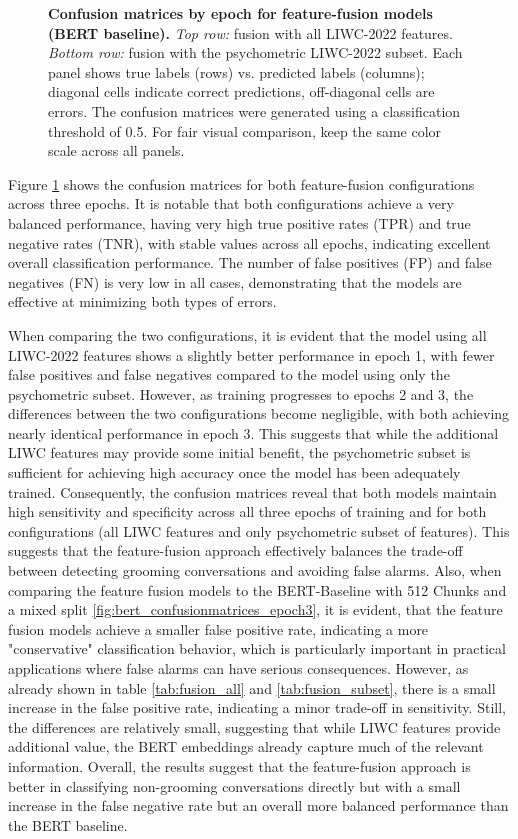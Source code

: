 \begin{figure}[H]
  \caption[Confusion matrices by epoch for feature-fusion models.]{\textbf{Confusion matrices by epoch for feature-fusion models (BERT baseline).}
  \emph{Top row:} fusion with all LIWC-2022 features. \emph{Bottom row:} fusion with the psychometric LIWC-2022 subset.
  Each panel shows true labels (rows) vs. predicted labels (columns); diagonal cells indicate correct predictions, off-diagonal cells are errors. The confusion matrices were generated using a classification threshold of 0.5.
  For fair visual comparison, keep the same color scale across all panels.}
  \label{fig:ff_confmats_epochs}
\end{figure}

Figure \ref{fig:ff_confmats_epochs} shows the confusion matrices for both feature-fusion configurations across three epochs. It is notable that both configurations achieve a very balanced performance, having very high true positive rates (TPR) and true negative rates (TNR), with stable values across all epochs, indicating excellent overall classification performance. The number of false positives (FP) and false negatives (FN) is very low in all cases, demonstrating that the models are effective at minimizing both types of errors. 

When comparing the two configurations, it is evident that the model using all LIWC-2022 features shows a slightly better performance in epoch 1, with fewer false positives and false negatives compared to the model using only the psychometric subset. However, as training progresses to epochs 2 and 3, the differences between the two configurations become negligible, with both achieving nearly identical performance in epoch 3. This suggests that while the additional LIWC features may provide some initial benefit, the psychometric subset is sufficient for achieving high accuracy once the model has been adequately trained. Consequently, the confusion matrices reveal that both models maintain high sensitivity and specificity across all three epochs of training and for both configurations (all LIWC features and only psychometric subset of features). This suggests that the feature-fusion approach effectively balances the trade-off between detecting grooming conversations and avoiding false alarms. Also, when comparing the feature fusion models to  the BERT-Baseline with 512 Chunks and a mixed split \ref{fig:bert_confusionmatrices_epoch3}, it is evident, that the feature fusion models achieve a smaller false positive rate, indicating a more "conservative" classification behavior, which is particularly important in practical applications where false alarms can have serious consequences. However, as already shown in table \ref{tab:fusion_all} and \ref{tab:fusion_subset}, there is a small increase in the false positive rate, indicating a minor trade-off in sensitivity. Still, the differences are relatively small, suggesting that while LIWC features provide additional value, the BERT embeddings already capture much of the relevant information. Overall, the results suggest that the feature-fusion approach is better in classifying non-grooming conversations directly but with a small increase in the false negative rate but an overall more balanced performance than the BERT baseline.


